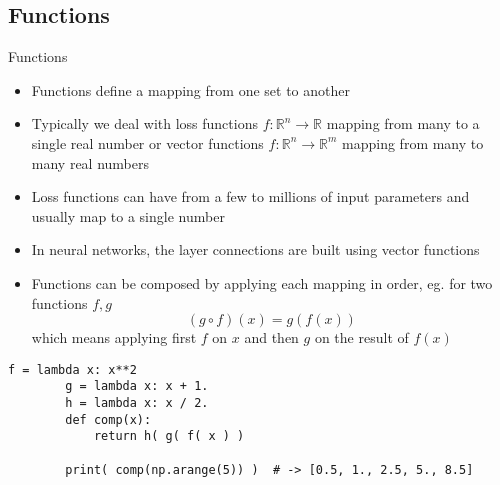 \subsection{Functions}

  \begin{frame}[fragile]{Functions}
    \begin{itemize}
      \item Functions define a mapping from one set to another
      \item Typically we deal with loss functions $f:\mathbb{R}^n \rightarrow \mathbb{R}$ mapping from many to a single real number or vector functions $f:\mathbb{R}^n \rightarrow \mathbb{R}^m$ mapping from many to many real numbers
      \item Loss functions can have from a few to millions of input parameters and usually map to a single number
      \item In neural networks, the layer connections are built using vector functions
      \item Functions can be composed by applying each mapping in order, eg. for two functions $f, g$
      \begin{equation*}
        (g\circ f)(x) = g(f(x))
      \end{equation*}
      which means applying first $f$ on $x$ and then $g$ on the result of $f(x)$
    \end{itemize}
    \begin{mdframed}
      \begin{lstlisting}[style=dark, gobble=8, title=\lsttitlelight{Composing functions in Python}]
        f = lambda x: x**2
        g = lambda x: x + 1.
        h = lambda x: x / 2.
        def comp(x):
            return h( g( f( x ) )

        print( comp(np.arange(5)) )  # -> [0.5, 1., 2.5, 5., 8.5]
      \end{lstlisting}
    \end{mdframed}
  \end{frame}

